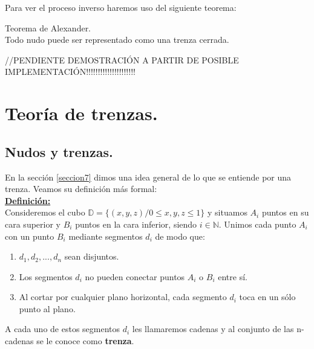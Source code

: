 \documentclass[14pt]{extarticle}
\begin{document}
Para ver el proceso inverso haremos uso del siguiente teorema:
\begin{teo}Teorema de Alexander.\\
	Todo nudo puede ser representado como una trenza cerrada.
\end{teo}
//PENDIENTE DEMOSTRACIÓN A PARTIR DE POSIBLE IMPLEMENTACIÓN!!!!!!!!!!!!!!!!!!!!!


\newpage
\section{Teoría de trenzas. }\label{SegundoTema}
\subsection{Nudos y trenzas.}\label{t2sec1}
En la sección \ref{seccion7} dimos una idea general de lo que se entiende por una trenza. Veamos su definición más formal:\\

\underline{\textbf{Definición:}}\\
Consideremos el cubo $\mathds{D} = \{(x,y,z) / 0 \leq x,y,z \leq 1\}$ y situamos $A_{i}$ puntos en su cara superior y $B_{i}$ puntos en la cara inferior, siendo $i \in \mathds{N}$. Unimos cada punto $A_{i}$ con un punto $B_{i}$ mediante segmentos $d_{i}$ de modo que:
\begin{enumerate}
	\item $ d_{1}, d_{2},...,d_{n} $ sean disjuntos.
	\item Los segmentos $ d_{i} $ no pueden conectar puntos $A_{i}$ o $B_{i}$ entre sí.
	\item Al cortar por cualquier plano horizontal, cada segmento $ d_{i} $ toca en un sólo punto al plano. 
\end{enumerate}
A cada uno de estos segmentos $ d_{i} $ les llamaremos cadenas y al conjunto de las n-cadenas se le conoce como \textbf{trenza}.\\
\end{document}
